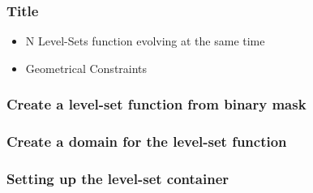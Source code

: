 \documentclass[18pt]{beamer}
\newcommand{\lstlistingwithnumber}[3]{
\begin{center}

\end{center}
}
\begin{document}

\begin{frame}
\frametitle{Title}
  \begin{itemize}
    \item N Level-Sets function evolving at the same time
    \item Geometrical Constraints
  \end{itemize}
\end{frame}


\begin{frame}
  \frametitle{Create a level-set function from binary mask}
  \lstlistingwithnumber{87}{94}{SingleLevelSetWhitaker.cxx}
  \lstlistingwithnumber{98}{100}{SingleLevelSetWhitaker.cxx}
\end{frame}


\begin{frame}
  \frametitle{Create a domain for the level-set function}
  \lstlistingwithnumber{106}{110}{SingleLevelSetWhitaker.cxx}
  \lstlistingwithnumber{114}{125}{SingleLevelSetWhitaker.cxx}
\end{frame}


\begin{frame}
  \frametitle{Setting up the level-set container}
  \lstlistingwithnumber{129}{135}{SingleLevelSetWhitaker.cxx}
  \lstlistingwithnumber{137}{144}{SingleLevelSetWhitaker.cxx}
\end{frame}

\end{document}
